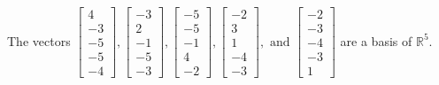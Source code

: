 \begin{exercise}
\begin{exerciseStatement}
  \end{exerciseStatement}
  \begin{exerciseAnswer}
   The vectors \(\left[\begin{array}{r}
4 \\
-3 \\
-5 \\
-5 \\
-4
\end{array}\right] , \left[\begin{array}{r}
-3 \\
2 \\
-1 \\
-5 \\
-3
\end{array}\right] , \left[\begin{array}{r}
-5 \\
-5 \\
-1 \\
4 \\
-2
\end{array}\right] , \left[\begin{array}{r}
-2 \\
3 \\
1 \\
-4 \\
-3
\end{array}\right] , \text{ and } \left[\begin{array}{r}
-2 \\
-3 \\
-4 \\
-3 \\
1
\end{array}\right]\) 
  	 are  a basis of \(\mathbb{R}^5\).
  


  \end{exerciseAnswer}
\end{exercise}